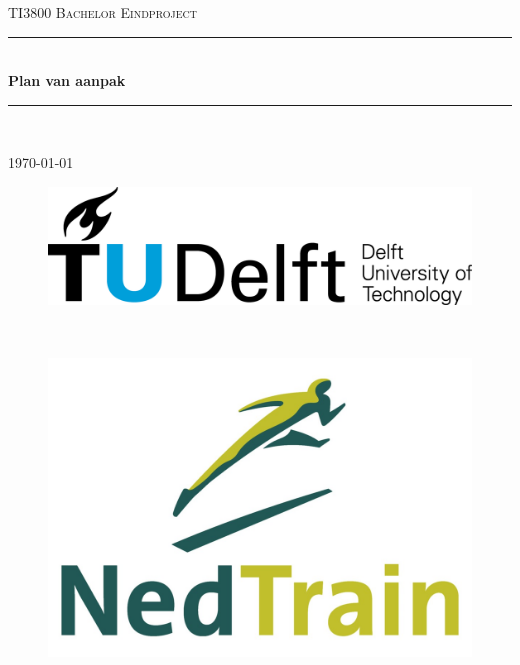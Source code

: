 \documentclass[a4paper]{article}
\makeatletter
\newcommand{\specialcell}[2][c]{%
  \begin{tabular}[#1]{@{}c@{}}#2\end{tabular}}
\makeatother
\begin{document}
\begin{titlepage}
	
\newcommand{\HRule}{\rule{\linewidth}{0.5mm}}
\center

\textsc{\huge TI3800 Bachelor Eindproject}\\[1.5cm]
	
\HRule \\[0.4cm]
{ \Huge \bfseries Plan van aanpak}\\[0.4cm]
\HRule \\[1.5cm]


{\large \today}\\[2cm]

\begin{figure}[b]
\centering
\begin{minipage}{0.4\textwidth}
\begin{flushleft}
\includegraphics[width=0.9\linewidth]{images/TU_Delft_logo.png}
\end{flushleft}
\end{minipage}
~
\begin{minipage}{0.4\textwidth}
\begin{flushright}
\includegraphics[width=0.9\linewidth]{images/NedTrain_logo.png}
\end{flushright}
\end{minipage}\\[2cm]
\end{figure}


\end{titlepage}
\end{document}
